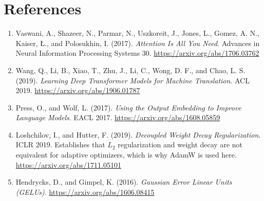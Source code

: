 \documentclass[11pt, oneside]{article}
\begin{document}
\section*{References}

\begin{enumerate}
    \item Vaswani, A., Shazeer, N., Parmar, N., Uszkoreit, J., Jones, L., Gomez, A. N.,
          Kaiser, {\L}., and Polosukhin, I. (2017). \emph{Attention Is All You Need}. Advances
          in Neural Information Processing Systems 30.
          \url{https://arxiv.org/abs/1706.03762}

    \item Wang, Q., Li, B., Xiao, T., Zhu, J., Li, C., Wong, D. F., and Chao, L. S. (2019).
          \emph{Learning Deep Transformer Models for Machine Translation}. ACL 2019.
          \url{https://arxiv.org/abs/1906.01787}

    \item Press, O., and Wolf, L. (2017). \emph{Using the Output Embedding to Improve Language
          Models}. EACL 2017. \url{https://arxiv.org/abs/1608.05859}

    \item Loshchilov, I., and Hutter, F. (2019). \emph{Decoupled Weight Decay Regularization}.
          ICLR 2019. Establishes that $L_2$ regularization and weight decay are not equivalent
          for adaptive optimizers, which is why AdamW is used here.
          \url{https://arxiv.org/abs/1711.05101}

    \item Hendrycks, D., and Gimpel, K. (2016). \emph{Gaussian Error Linear Units (GELUs)}.
          \url{https://arxiv.org/abs/1606.08415}
\end{enumerate}
\end{document}
